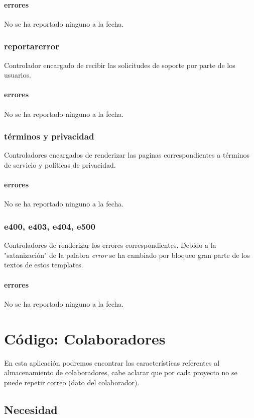 \documentclass[10pt,a4paper]{book}
\begin{document}
	\subsubsection{errores}
	No se ha reportado ninguno a la fecha.

	\subsection{reportarerror}
	Controlador encargado de recibir las solicitudes de soporte por parte de los usuarios.
	\subsubsection{errores}
	No se ha reportado ninguno a la fecha.

	\subsection{términos y privacidad}
	Controladores encargados de renderizar las paginas correspondientes a términos de servicio y políticas de privacidad.
	\subsubsection{errores}
	No se ha reportado ninguno a la fecha.

	\subsection{e400, e403, e404, e500}
	Controladores de renderizar los errores correspondientes. Debido a la "satanización" de la palabra \textit{error} se ha cambiado por bloqueo gran parte de los textos de estos templates.
	\subsubsection{errores}
	No se ha reportado ninguno a la fecha.


	\chapter{Código: Colaboradores}

	En esta aplicación podremos encontrar las características referentes al almacenamiento de colaboradores, cabe aclarar que por cada proyecto no se puede repetir correo (dato del colaborador).

	\section{Necesidad}
\end{document}
